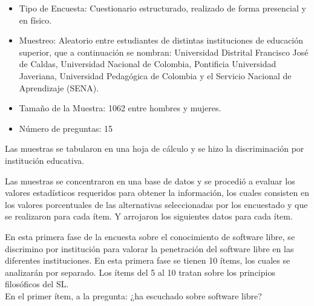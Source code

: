 \begin{multicols}{2}

\begin{itemize}

\item Tipo de Encuesta: Cuestionario estructurado, realizado de forma presencial y en f\'isico.

\item Muestreo: Aleatorio entre estudiantes de distintas instituciones de educaci\'on superior, que a continuaci\'on se nombran: Universidad Distrital Francisco Jos\'e de Caldas, Universidad Nacional de Colombia, Pontificia Universidad Javeriana, Universidad Pedag\'ogica de Colombia y el Servicio Nacional de Aprendizaje (SENA).

\item Tama\~no de la Muestra: 1062 entre hombres y mujeres.

\item Número de preguntas: 15

\end{itemize}

Las muestras se tabularon en una hoja de c\'alculo y se hizo la discriminaci\'on por instituci\'on educativa.\\

\vspace{2cm}

Las muestras se concentraron en una base de datos y se procedi\'o a evaluar los valores estad\'isticos requeridos para obtener la informaci\'on, los cuales consisten en los valores porcentuales de las alternativas seleccionadas por los encuestado y que se realizaron para cada \'item. Y arrojaron los siguientes datos para cada \'item. \\


En esta primera fase de la encuesta sobre el conocimiento de software libre, se discrimino por instituci\'on para valorar la penetraci\'on del software libre en las diferentes instituciones. En esta primera fase se tienen 10 \'items, los cuales se analizar\'an por separado. Los \'items del 5 al 10 tratan sobre los principios  filos\'oficos del SL.\\
En el primer \'item,  a la pregunta: ¿ha escuchado sobre software libre?



\end{multicols}
